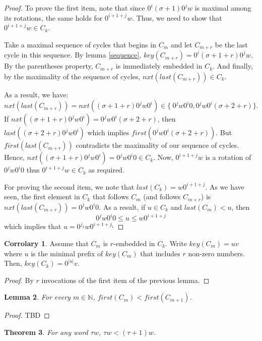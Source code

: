 \documentclass{article}
\newtheorem{theorem}{Theorem}
\newtheorem{lemma}[theorem]{Lemma}
\theoremstyle{definition}
\newtheorem{corrolary}[theorem]{Corrolary}
\newcommand{\N}{{\mathbb{N}}}
\begin{document}
\begin{proof}
	To prove the first item, note that since $0^i(\sigma+1)0^jw$ is maximal among its rotations, the same holds for $0^{i+1+j}w$. Thus, we need to show that $0^{i+1+j}w\in C_k$. 
	
	Take a maximal sequence of cycles that begins in $C_m$ and let $C_{m+r}$ be the last cycle in this sequence. By lemma \ref{sequence}, $key(C_{m+r})=0^i(\sigma+1+r)0^jw$. By the parentheses property, $C_{m+r}$ is immediately embedded in $C_k$. And finally, by the maximality of the sequence of cycles, $nxt(last(C_{m+r}))\in C_k$.
	
	As a result, we have:
	$$nxt(last(C_{m+r}))=nxt((\sigma+1+r)0^jw0^i)\in\{\ 0^jw0^i0, 0^jw0^i(\sigma+2+r)\}.$$ If $nxt((\sigma+1+r)0^jw0^i)= 0^jw0^i(\sigma+2+r)$, then $last((\sigma+2+r)0^jw0^i)$ which implies $first(0^jw0^i(\sigma+2+r))$. But $first(last(C_{m+r}))$ contradicts the maximality of our sequence of cycles. Hence, $nxt((\sigma+1+r)0^jw0^i)= 0^jw0^i0\in C_k$. Now, $0^{i+1+j}w$ is a rotation of $0^jw0^i0$ thus $0^{i+1+j}w\in C_k$ as required.
	
	For proving the second item, we note that $last(C_k)=w0^{i+1+j}$. As we have seen, the first element in $C_k$ that follows $C_m$ (and follows $C_{m+r}$) is $nxt(last(C_{m+r}))= 0^jw0^i0$. As a result, if $u\in C_k$ and $last(C_m)<u$, then 
	$$0^jw0^i0\leq u \leq w0^{i+1+j}$$
	which implies that $u=0^{j_2}w0^{i+1+j_1}$
\end{proof}

\begin{corrolary}
	\label{embedding-deletes-zeroes}
	Assume that $C_m$ is $r$-embedded in $C_k$. Write $key(C_m)=uv$ where $u$ is the minimal prefix of $key(C_m)$ that includes $r$ non-zero numbers. Then, $key(C_k)=0^{|u|}v$.
\end{corrolary}

\begin{proof}
	By $r$ invocations of the first item of the previous lemma.
\end{proof}

\begin{lemma}
	\label{first-ordering}
	For every $m\in\N$, $first(C_m)<first (C_{m+1})$.
\end{lemma}

\begin{proof}
	TBD
\end{proof}

\begin{theorem}
	For any word $\tau w$, $\tau w<(\tau+1)w$.
\end{theorem}
\end{document}
